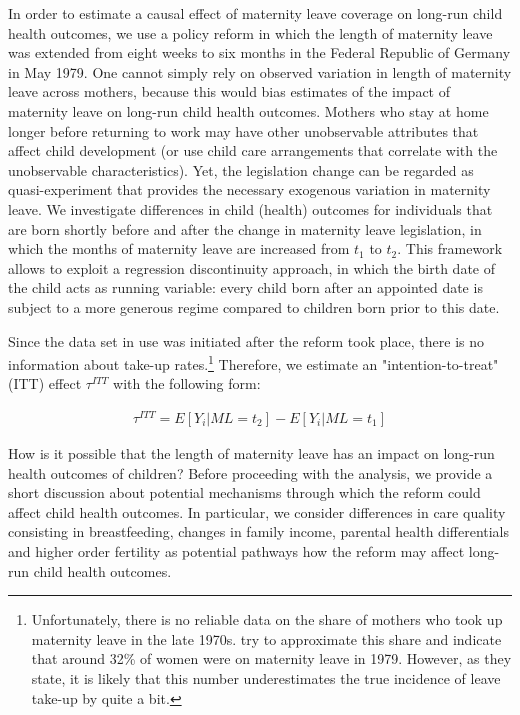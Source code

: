 \documentclass[a4paper ]{article}
\begin{document}
In order to estimate a causal effect of maternity leave coverage on long-run child health outcomes, we use a policy reform in which the length of maternity leave was extended from eight weeks to six months in the Federal Republic of Germany in May 1979. One cannot simply rely on observed variation in length of maternity leave across mothers, because this would bias estimates of the impact of maternity leave on long-run child health outcomes. Mothers who stay at home longer before returning to work may have other unobservable attributes that affect child development (or use child care arrangements that correlate with the unobservable characteristics). Yet, the legislation change can be regarded as quasi-experiment that provides the necessary exogenous variation in maternity leave.\newline
We investigate differences in child (health) outcomes for individuals that are born shortly before and after the change in maternity leave legislation, in which the months of maternity leave are increased from $t_1$ to $t_2$. This framework allows to exploit a regression discontinuity approach, in which the birth date of the child acts as running variable: every child born after an appointed date is subject to a more generous regime compared to children born prior to this date.\newline

Since the data set in use was initiated after the reform took place, there is no information about take-up rates.\footnote{Unfortunately, there is no reliable  data on the share of mothers who took up maternity leave in the late 1970s. \cite{dustmann2012expansions} try to approximate this share and indicate that around 32\% of women were on maternity leave in 1979. However, as they state, it is likely that this number underestimates the true incidence of leave take-up by quite a bit.} Therefore, we estimate an "intention-to-treat" (ITT) effect $\tau^{ITT}$ with the following form:

\begin{align}
\tau^{ITT}= E[Y_i|ML = t_2] - E[Y_i|ML=t_1]\label{eq: treatmenteffect}
\end{align}


How is it possible that the length of maternity leave has an impact on long-run health outcomes of children? Before proceeding with the analysis, we provide a short discussion about potential mechanisms through which the reform could affect child health outcomes. In particular, we consider differences in care quality consisting in breastfeeding, changes in family income, parental health differentials and higher order fertility as potential pathways how the reform may affect long-run child health outcomes.  \newline
\end{document}
